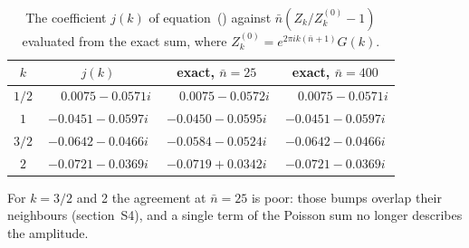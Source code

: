 \documentclass{iopjournal}
\newcommand{\nbar}{\bar{n}}
\begin{document}
\begin{table}
\centering
\caption{The coefficient $j(k)$ of equation~() against $\nbar(Z_k/Z_k^{(0)}-1)$ evaluated from the exact sum, where $Z_k^{(0)} = e^{2\pi ik(\nbar+1)}G(k)$.}
\begin{tabular}{cccc}
\hline
$k$ & $j(k)$ & exact, $\nbar = 25$ & exact, $\nbar = 400$ \\
\hline
$1/2$ & $\phantom{-}0.0075-0.0571i$ & $\phantom{-}0.0075-0.0572i$ & $\phantom{-}0.0075-0.0571i$ \\
$1$ & $-0.0451-0.0597i$ & $-0.0450-0.0595i$ & $-0.0451-0.0597i$ \\
$3/2$ & $-0.0642-0.0466i$ & $-0.0584-0.0524i$ & $-0.0642-0.0466i$ \\
$2$ & $-0.0721-0.0369i$ & $-0.0719+0.0342i$ & $-0.0721-0.0369i$ \\
\hline
\end{tabular}
\label{tab:S-j}
\end{table}

For $k = 3/2$ and 2 the agreement at $\nbar = 25$ is poor: those bumps overlap their neighbours (section~S4), and a single term of the Poisson sum no longer describes the amplitude.
\end{document}

